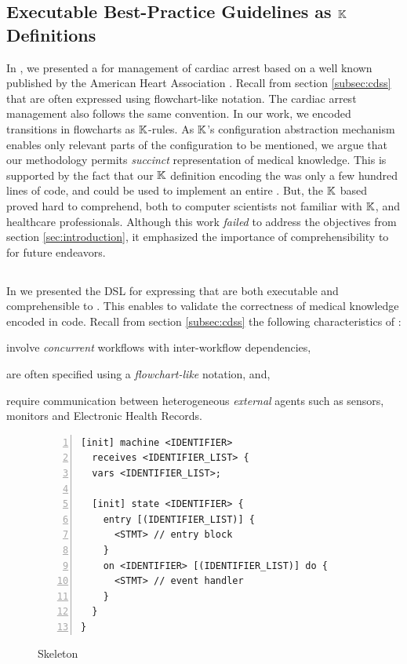 \subsection{Executable Best-Practice Guidelines as $\mathbb{K}$ Definitions}\label{subsec:BPG-in-K}

In \cite{Saxena22TR}, we presented a \CDSS{} for management of
cardiac arrest based on a well known \BPG{} published by the American Heart
Association \cite{AHAUrl}. Recall from section \ref{subsec:cdss} that
\BPGs{} are often expressed using flowchart-like notation. The cardiac arrest
management \BPG{} also follows the same convention. In our work, we encoded
transitions in \BPG{} flowcharts as $\mathbb{K}$-rules. As $\mathbb{K}$'s
configuration abstraction mechanism enables only relevant parts of the
configuration to be mentioned, we argue that our methodology permits
\emph{succinct} representation of medical knowledge. This is supported by
the fact that our $\mathbb{K}$ definition encoding the \BPG{} was only a few hundred lines of
code, and could be used to implement an entire \CDSS{}. But, the $\mathbb{K}$ based
\BPG{} proved hard to comprehend, both to computer scientists not familiar with
$\mathbb{K}$, and healthcare professionals. Although this work \emph{failed} to address
the objectives from section \ref{sec:introduction}, it emphasized the importance
of comprehensibility to \HCPs{} for future endeavors.

\subsection{\MediK{}}\label{subsec:medik}

In \cite{SaxenaFMCAD23} we presented the \MediK{} DSL for expressing
\BPGs{} that are both executable and comprehensible to \HCPs{}. This
enables \HCPs{} to validate the correctness of medical knowledge encoded
in \MediK{} code. Recall from section \ref{subsec:cdss} the following
characteristics of \BPGs{}:
\begin{enumerate*}[label=(\alph*)]
  \item involve \emph{concurrent} workflows with inter-workflow dependencies,
  \item are often specified using a \emph{flowchart-like} notation, and,
  \item require communication between heterogeneous \emph{external} agents such
    as sensors, monitors and Electronic Health Records.
\end{enumerate*}

\begin{figure}
    \caption{\MediK{} \FSM{} Skeleton}\label{fig:medik-skeleton}
\begin{lstlisting}[style=mediksty
,language=medik
,basicstyle=\ttfamily\notsotiny
,numbers=left
,numberstyle=\tiny
,framexleftmargin=1.5em
,xleftmargin=2em
]
[init] machine <IDENTIFIER>
  receives <IDENTIFIER_LIST> {
  vars <IDENTIFIER_LIST>;

  [init] state <IDENTIFIER> {
    entry [(IDENTIFIER_LIST)] {
      <STMT> // entry block
    }
    on <IDENTIFIER> [(IDENTIFIER_LIST)] do {
      <STMT> // event handler
    }
  }
}
\end{lstlisting}
\end{figure}

